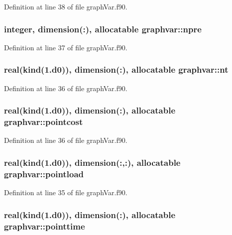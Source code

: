 Definition at line 38 of file graph\-Var.\-f90.

\hypertarget{classgraphvar_ac32e47ccf07b072eeafcec3b9e88d796}{
\subsubsection[{npre}]{\setlength{\rightskip}{0pt plus 5cm}integer, dimension(\-:), allocatable graphvar\-::npre}}\label{classgraphvar_ac32e47ccf07b072eeafcec3b9e88d796}


Definition at line 37 of file graph\-Var.\-f90.

\hypertarget{classgraphvar_a7a5f6e8feb558a58e3da62a98f82460d}{
\subsubsection[{nt}]{\setlength{\rightskip}{0pt plus 5cm}real(kind(1.d0)), dimension(\-:), allocatable graphvar\-::nt}}\label{classgraphvar_a7a5f6e8feb558a58e3da62a98f82460d}


Definition at line 36 of file graph\-Var.\-f90.

\hypertarget{classgraphvar_ac970f8c36514c71b7a853e40044adb0d}{
\subsubsection[{pointcost}]{\setlength{\rightskip}{0pt plus 5cm}real(kind(1.d0)), dimension(\-:), allocatable graphvar\-::pointcost}}\label{classgraphvar_ac970f8c36514c71b7a853e40044adb0d}


Definition at line 36 of file graph\-Var.\-f90.

\hypertarget{classgraphvar_a1954093c5fbabd93e5fe7edd2a31d832}{
\subsubsection[{pointload}]{\setlength{\rightskip}{0pt plus 5cm}real(kind(1.d0)), dimension(\-:,\-:), allocatable graphvar\-::pointload}}\label{classgraphvar_a1954093c5fbabd93e5fe7edd2a31d832}


Definition at line 35 of file graph\-Var.\-f90.

\hypertarget{classgraphvar_a86e3f05c7a1e138ae02e9fb054265283}{
\subsubsection[{pointtime}]{\setlength{\rightskip}{0pt plus 5cm}real(kind(1.d0)), dimension(\-:), allocatable graphvar\-::pointtime}}\label{classgraphvar_a86e3f05c7a1e138ae02e9fb054265283}



